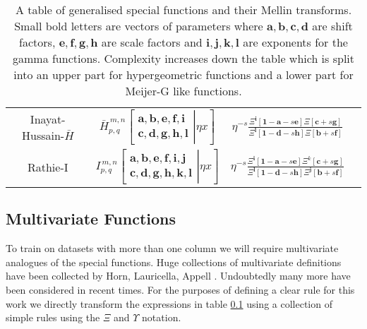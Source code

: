 \documentclass[journal=jcisd8,manuscript=article,layout=onecolumn,pdftex,floatfix,amsmath,amssymb,10pt]{achemso}
\begin{document}
\begin{table}
\begin{tabular}{|c|c|c|c|}
Inayat-Hussain-$\bar{H}$  & $\bar{H}_{p,q}^{\,m,n} \!\left[\left. \begin{matrix}
\mathbf{a},\mathbf{b},\mathbf{e,f,i} \\
\mathbf{c},\mathbf{d},\mathbf{g,h,l} \end{matrix} \right| \eta x \right]$ & $\eta^{-s}\frac{\Xi^{\mathbf{i}}[\mathbf{1-a}-s\mathbf{e}]\Xi[\mathbf{c}+s\mathbf{g}]}{\Xi^{\mathbf{l}}[\mathbf{1-d}-s\mathbf{h}] \Xi[\mathbf{b} + s \mathbf{f}]}$ &\\
Rathie-I & $I_{p,q}^{\,m,n} \!\left[\left. \begin{matrix}
\mathbf{a},\mathbf{b},\mathbf{e,f,i,j} \\
\mathbf{c},\mathbf{d},\mathbf{g,h,k,l} \end{matrix} \right| \eta x \right]$ & $\eta^{-s}\frac{\Xi^{\mathbf{i}}[\mathbf{1-a}-s\mathbf{e}]\Xi^{k}[\mathbf{c}+s\mathbf{g}]}{\Xi^{\mathbf{l}}[\mathbf{1-d}-s\mathbf{h}] \Xi^{\mathbf{j}}[\mathbf{b} + s \mathbf{f}]}$ &\\
\hline
\end{tabular}
\caption{A table of generalised special functions and their Mellin transforms. Small bold letters are vectors of parameters where $\mathbf{a,b,c,d}$ are shift factors, $\mathbf{e,f,g,h}$ are scale factors and $\mathbf{i,j,k,l}$ are exponents for the gamma functions. Complexity increases down the table which is split into an upper part for hypergeometric functions and a lower part for Meijer-G like functions.}
\end{table}

\subsection{Multivariate Functions}
To train on datasets with more than one column we will require multivariate analogues of the special functions. Huge collections of multivariate definitions have been collected by Horn, Lauricella, Appell \cite{}. Undoubtedly many more have been considered in recent times. For the purposes of defining a clear rule for this work we directly transform the expressions in table \ref{} using a collection of simple rules using the $\Xi$ and $\Upsilon$ notation.
\end{document}
